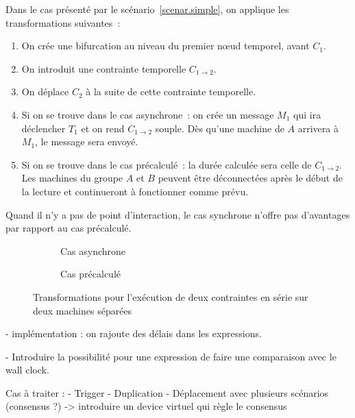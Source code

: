 \documentclass{article}
\newcommand\timenode{nœud temporel\xspace}
\begin{document}
Dans le cas présenté par le scénario~\ref{scenar.simple}, on applique les transformations suivantes~: 
\begin{enumerate}
    \item On crée une bifurcation au niveau du premier \timenode, avant $C_1$.
    \item On introduit une contrainte temporelle $C_{1\rightarrow2}$.
    \item On déplace $C_2$ à la suite de cette contrainte temporelle.
    \item Si on se trouve dans le cas asynchrone~: on crée un message $M_1$ qui ira déclencher $T_1$ et on rend $C_{1\rightarrow2}$ souple.
    Dès qu'une machine de $A$ arrivera à $M_1$, le message sera envoyé.
    \item Si on se trouve dans le cas précalculé~: la durée calculée sera celle de $C_{1\rightarrow2}$. Les machines du groupe $A$ et $B$ peuvent être déconnectées après le début de la lecture et continueront à fonctionner comme prévu.
\end{enumerate}
Quand il n'y a pas de point d'interaction, le cas synchrone n'offre pas d'avantages par rapport au cas précalculé.

\begin{figure}[h]
\centering
\begin{subfigure}{.5\linewidth}
\begin{tikzpicture}

\end{tikzpicture}
\caption{Cas asynchrone}
\end{subfigure}

\begin{subfigure}{.5\linewidth}
    \begin{tikzpicture}
    
    \end{tikzpicture}
    \caption{Cas précalculé}
\end{subfigure}
\caption{Transformations pour l'exécution de deux contraintes en série sur deux machines séparées}
\label{scenar.deplacement}
\end{figure}

- implémentation : on rajoute des délais dans les expressions.

- Introduire la possibilité pour une expression de faire une comparaison avec le wall clock.


Cas à traiter : 
- Trigger
- Duplication
- Déplacement avec plusieurs scénarios (consensus ?) -> introduire un device virtuel qui règle le consensus
\end{document}
